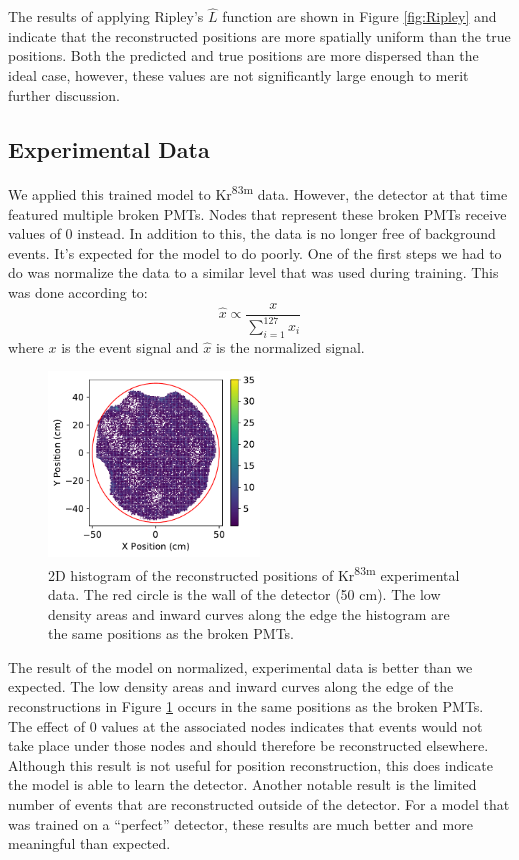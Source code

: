\documentclass[../thesis.tex]{subfiles}
\begin{document}
\par The results of applying Ripley's $\widehat{L}$ function are shown in Figure \ref{fig:Ripley} and indicate that the reconstructed positions are more spatially uniform than the true positions.
Both the predicted and true positions are more dispersed than the ideal case, however, these values are not significantly large enough to merit further discussion.

\subsection{Experimental Data}\label{subsec:Experiment}
We applied this trained model to Kr\textsuperscript{83m} data.
However, the detector at that time featured multiple broken PMTs.
Nodes that represent these broken PMTs receive values of 0 instead.
In addition to this, the data is no longer free of background events.
It's expected for the model to do poorly.
One of the first steps we had to do was normalize the data to a similar level that was used during training.
This was done according to:
\begin{equation}
	\hat{x} \propto \dfrac{x}{\sum_{i=1}^{127} x_i}
\end{equation}
where $x$ is the event signal and $\hat{x}$ is the normalized signal.

\begin{figure}[t]
	\centering
	\includegraphics[width=0.5\textwidth]{figures/iso-kr83_reco_pos.pdf}
	\caption{
	2D histogram of the reconstructed positions of Kr\textsuperscript{83m} experimental data.
	The red circle is the wall of the detector (50 cm).
	The low density areas and inward curves along the edge the histogram are the same positions as the broken PMTs.
	}
	\label{fig:iso_2D-hist}
\end{figure}

\par The result of the model on normalized, experimental data is better than we expected.
The low density areas and inward curves along the edge of the reconstructions in Figure \ref{fig:iso_2D-hist} occurs in the same positions as the broken PMTs.
The effect of 0 values at the associated nodes indicates that events would not take place under those nodes and should therefore be reconstructed elsewhere.
Although this result is not useful for position reconstruction, this does indicate the model is able to learn the detector.
Another notable result is the limited number of events that are reconstructed outside of the detector.
For a model that was trained on a ``perfect'' detector, these results are much better and more meaningful than expected.
\end{document}
